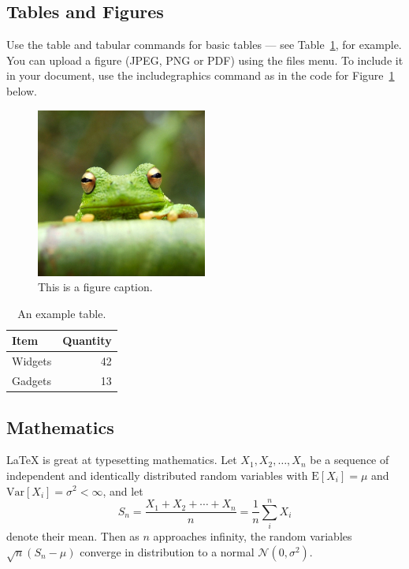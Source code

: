 
\subsection{Tables and Figures}

Use the table and tabular commands for basic tables --- see Table~\ref{tab:widgets}, for example. You can upload a figure (JPEG, PNG or PDF) using the files menu. To include it in your document, use the includegraphics command as in the code for Figure~\ref{fig:frog} below.

\begin{figure}
\centering
\includegraphics[width=0.5\textwidth]{frog.jpg}
\caption{\label{fig:frog}This is a figure caption.}
\end{figure}

\begin{table}
\centering
\begin{tabular}{l|r}
Item & Quantity \\\hline
Widgets & 42 \\
Gadgets & 13
\end{tabular}
\caption{\label{tab:widgets}An example table.}
\end{table}

\subsection{Mathematics}

\LaTeX{} is great at typesetting mathematics. Let $X_1, X_2, \ldots, X_n$ be a sequence of independent and identically distributed random variables with $\text{E}[X_i] = \mu$ and $\text{Var}[X_i] = \sigma^2 < \infty$, and let
$$S_n = \frac{X_1 + X_2 + \cdots + X_n}{n}
      = \frac{1}{n}\sum_{i}^{n} X_i$$
denote their mean. Then as $n$ approaches infinity, the random variables $\sqrt{n}(S_n - \mu)$ converge in distribution to a normal $\mathcal{N}(0, \sigma^2)$.

